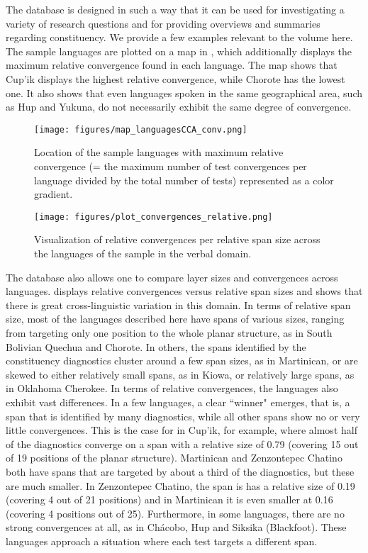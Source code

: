 \documentclass[output=paper,draftmode]{langscibook}
\begin{document}
The database is designed in such a way that it can be used for investigating a variety of research questions and for providing overviews and summaries regarding constituency.
We provide a few examples relevant to the volume here.
The sample languages are plotted on a map in , which additionally displays the maximum relative convergence found in each language. The map shows that Cup'ik displays the highest relative convergence, while Chorote has the lowest one. It also shows that even languages spoken in the same geographical area, such as Hup and Yukuna, do not necessarily exhibit the same degree of convergence.

\begin{figure}
    \texttt{[image: figures/map\_languagesCCA\_conv.png]}
    \caption{Location of the sample languages with maximum relative convergence (= the maximum number of test convergences per language divided by the total number of tests) represented as a color gradient.}
    \label{fig:map-lang}
\end{figure}

\begin{figure}
    \texttt{[image: figures/plot\_convergences\_relative.png]}
    \caption{Visualization of relative convergences per relative span size across the languages of the sample in the verbal domain.}
    \label{fig:convergence-lang}
\end{figure}

The database also allows one to compare layer sizes and convergences across languages.  displays relative convergences versus relative span sizes and shows that there is great cross-linguistic variation in this domain.
In terms of relative span size, most of the languages described here have spans of various sizes, ranging from targeting only one position to the whole planar structure, as in South Bolivian Quechua and Chorote.
In others, the spans identified by the constituency diagnostics cluster around a few span sizes, as in Martinican, or are skewed to either relatively small spans, as in Kiowa, or relatively large spans, as in Oklahoma Cherokee. 
In terms of relative convergences, the languages also exhibit vast differences. In a few languages, a clear ``winner" emerges, that is, a span that is identified by many diagnostics, while all other spans show no or very little convergences. 
This is the case for in Cup'ik, for example, where almost half of the diagnostics converge on a span with a relative size of 0.79 (covering 15 out of 19 positions of the planar structure).
Martinican and Zenzontepec Chatino both have spans that are targeted by about a third of the diagnostics, but these are much smaller. In Zenzontepec Chatino, the span is has a relative size of 0.19 (covering 4 out of 21 positions) and in Martinican it is even smaller at 0.16 (covering 4 positions out of 25).
Furthermore, in some languages, there are no strong convergences at all, as in Chácobo, Hup and Siksika (Blackfoot). These languages approach a situation where each test targets a different span. 
\end{document}
